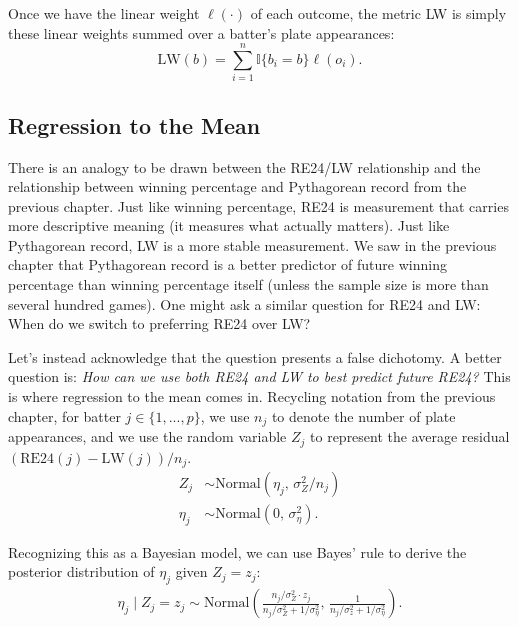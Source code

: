 \documentclass{article}
\begin{document}
        Once we have the linear weight $\ell(\cdot)$ of each outcome, the metric LW is simply these linear weights summed over a batter's plate appearances:
        \begin{equation*}
          \text{LW}(b) = \sum_{i = 1}^n \mathbb{I}\{b_i = b\} \ell(o_i).
        \end{equation*}

    \subsection{\sc Regression to the Mean}

      There is an analogy to be drawn between the RE24/LW relationship and the relationship between winning percentage and Pythagorean record from the previous chapter. Just like winning percentage, RE24 is measurement that carries more descriptive meaning (it measures what actually matters). Just like Pythagorean record, LW is a more stable measurement. We saw in the previous chapter that Pythagorean record is a better predictor of future winning percentage than winning percentage itself (unless the sample size is more than several hundred games). One might ask a similar question for RE24 and LW: When do we switch to preferring RE24 over LW?

      Let's instead acknowledge that the question presents a false dichotomy. A better question is: {\it How can we use both RE24 and LW to best predict future RE24?} This is where regression to the mean comes in. Recycling notation from the previous chapter, for batter $j \in \{1, ..., p\}$, we use $n_j$ to denote the number of plate appearances, and we use the random variable $Z_j$ to represent the average residual $(\mbox{RE24}(j) - \mbox{LW}(j)) / n_j$.
      \begin{align*}
        Z_j &\sim \mbox{Normal}(\eta_j,\, \sigma^2_Z / n_j)\\
        \eta_j &\sim \mbox{Normal}(0,\, \sigma^2_\eta).
      \end{align*}

      Recognizing this as a Bayesian model, we can use Bayes' rule to derive the posterior distribution of $\eta_j$ given $Z_j = z_j$:
      \begin{align*}
        \eta_j \mid Z_j = z_j \sim \mbox{Normal}\left(\frac{n_j / \sigma^2_Z \cdot z_j}{n_j / \sigma^2_Z + 1 / \sigma^2_\eta},\, \frac{1}{n_j / \sigma^2_z + 1 / \sigma^2_\eta}\right).
      \end{align*}
\end{document}
